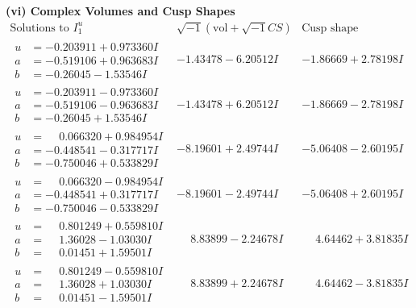 \documentclass[1p]{elsarticle_modified}
\theoremstyle{definition}
\newcommand{\I}{\sqrt{-1}}
\begin{document}
\newpage\flushleft \textbf{(vi) Complex Volumes and Cusp Shapes}
$$\begin{array}{c|c|c}  
\text{Solutions to }I^u_{1}& \I (\text{vol} + \sqrt{-1}CS) & \text{Cusp shape}\\
 \hline 
\begin{aligned}
u &= -0.203911 + 0.973360 I \\
a &= -0.519106 + 0.963683 I \\
b &= -0.26045 - 1.53546 I\end{aligned}
 & -1.43478 - 6.20512 I & -1.86669 + 2.78198 I \\ \hline\begin{aligned}
u &= -0.203911 - 0.973360 I \\
a &= -0.519106 - 0.963683 I \\
b &= -0.26045 + 1.53546 I\end{aligned}
 & -1.43478 + 6.20512 I & -1.86669 - 2.78198 I \\ \hline\begin{aligned}
u &= \phantom{-}0.066320 + 0.984954 I \\
a &= -0.448541 - 0.317717 I \\
b &= -0.750046 + 0.533829 I\end{aligned}
 & -8.19601 + 2.49744 I & -5.06408 - 2.60195 I \\ \hline\begin{aligned}
u &= \phantom{-}0.066320 - 0.984954 I \\
a &= -0.448541 + 0.317717 I \\
b &= -0.750046 - 0.533829 I\end{aligned}
 & -8.19601 - 2.49744 I & -5.06408 + 2.60195 I \\ \hline\begin{aligned}
u &= \phantom{-}0.801249 + 0.559810 I \\
a &= \phantom{-}1.36028 - 1.03030 I \\
b &= \phantom{-}0.01451 + 1.59501 I\end{aligned}
 & \phantom{-}8.83899 - 2.24678 I & \phantom{-}4.64462 + 3.81835 I \\ \hline\begin{aligned}
u &= \phantom{-}0.801249 - 0.559810 I \\
a &= \phantom{-}1.36028 + 1.03030 I \\
b &= \phantom{-}0.01451 - 1.59501 I\end{aligned}
 & \phantom{-}8.83899 + 2.24678 I & \phantom{-}4.64462 - 3.81835 I \\ \hline\begin{aligned}

\end{aligned}
\end{array}$$
\end{document}

